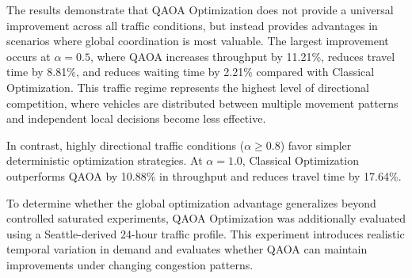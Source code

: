 \documentclass[12pt]{article}
\begin{document}
The results demonstrate that QAOA Optimization does not provide a universal improvement across all traffic conditions, but instead provides advantages in scenarios where global coordination is most valuable. The largest improvement occurs at $\alpha=0.5$, where QAOA increases throughput by 11.21\%, reduces travel time by 8.81\%, and reduces waiting time by 2.21\% compared with Classical Optimization. This traffic regime represents the highest level of directional competition, where vehicles are distributed between multiple movement patterns and independent local decisions become less effective.

In contrast, highly directional traffic conditions ($\alpha \geq 0.8$) favor simpler deterministic optimization strategies. At $\alpha=1.0$, Classical Optimization outperforms QAOA by 10.88\% in throughput and reduces travel time by 17.64\%.

To determine whether the global optimization advantage generalizes beyond controlled saturated experiments, QAOA Optimization was additionally evaluated using a Seattle-derived 24-hour traffic profile. This experiment introduces realistic temporal variation in demand and evaluates whether QAOA can maintain improvements under changing congestion patterns.
\end{document}
